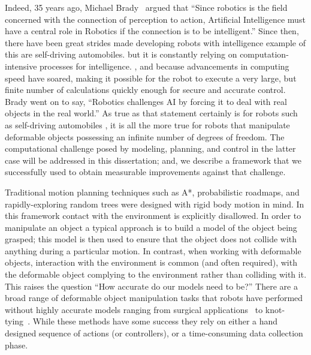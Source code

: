 Indeed, 35 years ago, Michael Brady~\cite{BRADY198579} argued that ``Since robotics is the field concerned with the connection of perception to action, Artificial Intelligence must have a central role in Robotics if the connection is to be intelligent.'' Since then, there have been great strides made developing robots with intelligence example of this are self-driving automobiles.  but it is constantly relying on computation-intensive processes for intelligence. , and because advancements in computing speed have soared, making it possible for the robot to execute a very large, but finite number of calculations quickly enough for secure and accurate control. Brady went on to say, ``Robotics challenges AI by forcing it to deal with real objects in the real world.'' As true as that statement certainly is for robots such as self-driving automobiles , it is all the more true for robots that manipulate deformable objects possessing an infinite number of degrees of freedom. The computational challenge posed by modeling, planning, and control in the latter case will be addressed in this dissertation; and, we describe a framework that we successfully used to obtain measurable improvements against that challenge.

Traditional motion planning techniques such as A*, probabilistic roadmaps, and rapidly-exploring random trees were designed with rigid body motion in mind. In this framework contact with the environment is explicitly disallowed. In order to manipulate an object a typical approach is to build a model of the object being grasped; this model is then used to ensure that the object does not collide with anything during a particular motion. In contrast, when working with deformable objects, interaction with the environment is common (and often required), with the deformable object complying to the environment rather than colliding with it. This raises the question ``How accurate do our models need to be?'' There are a broad range of deformable object manipulation tasks that robots have performed without highly accurate models ranging from surgical applications~\cite{Wang2018} to knot-tying~\cite{Huang2015}. While these methods have some success they rely on either a hand designed sequence of actions (or controllers), or a time-consuming data collection phase.

